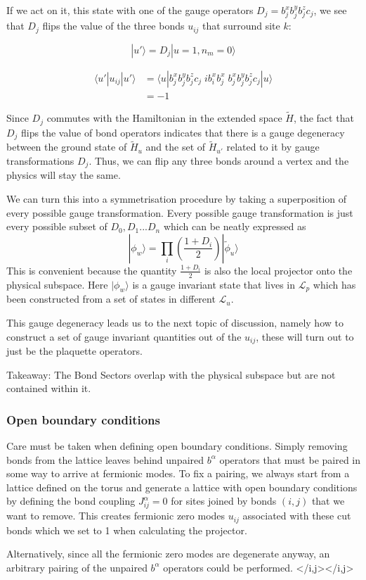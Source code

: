 If we act on it, this state with one of the gauge operators \(D_j = b_j^x b_j^y b_j^z c_j\), we see that \(D_j\) flips the value of the three bonds \(u_{ij}\) that surround site \(k\):

\[ |u'\rangle = D_j |u=1, n_m = 0\rangle\]

\[ \begin{aligned}
\langle u'|u_{ij}|u'\rangle &=  \langle u| b_j^x b_j^y b_j^z c_j \;ib^x_i b^x_j\; b_j^x b_j^y b_j^z c_j|u\rangle\\
&= -1
\end{aligned}\]

Since \(D_j\) commutes with the Hamiltonian in the extended space \(\tilde{H}\), the fact that \(D_j\) flips the value of bond operators indicates that there is a gauge degeneracy between the ground state of \(\tilde{H}_u\) and the set of \(\tilde{H}_{u'}\) related to it by gauge transformations \(D_j\). Thus, we can flip any three bonds around a vertex and the physics will stay the same.

We can turn this into a symmetrisation procedure by taking a superposition of every possible gauge transformation. Every possible gauge transformation is just every possible subset of \({D_0, D_1 ... D_n}\) which can be neatly expressed as \[|\phi_w\rangle = \prod_i \left( \frac{1 + D_i}{2}\right) |\tilde{\phi}_u\rangle\] This is convenient because the quantity \(\frac{1 + D_i}{2}\) is also the local projector onto the physical subspace. Here \(|\phi_w\rangle\) is a gauge invariant state that lives in \(\mathcal{L}_p\) which has been constructed from a set of states in different \(\mathcal{L}_u\).

This gauge degeneracy leads us to the next topic of discussion, namely how to construct a set of gauge invariant quantities out of the \(u_{ij}\), these will turn out to just be the plaquette operators.

Takeaway: The Bond Sectors overlap with the physical subspace but are not contained within it.

\hypertarget{open-boundary-conditions}{%
\subsubsection{Open boundary conditions}\label{open-boundary-conditions}}

Care must be taken when defining open boundary conditions. Simply removing bonds from the lattice leaves behind unpaired \(b^\alpha\) operators that must be paired in some way to arrive at fermionic modes. To fix a pairing, we always start from a lattice defined on the torus and generate a lattice with open boundary conditions by defining the bond coupling \(J^{\alpha}_{ij} = 0\) for sites joined by bonds \((i,j)\) that we want to remove. This creates fermionic zero modes \(u_{ij}\) associated with these cut bonds which we set to 1 when calculating the projector.

Alternatively, since all the fermionic zero modes are degenerate anyway, an arbitrary pairing of the unpaired \(b^\alpha\) operators could be performed. \textless/i,j\textgreater\textless/i,j\textgreater{}

